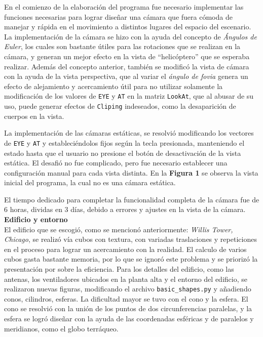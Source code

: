 \documentclass[letterpaper,11pt]{article}
\begin{document}
En el comienzo de la elaboración del programa fue necesario implementar las funciones necesarias para lograr diseñar una cámara que fuera cómoda de manejar y rápida en el movimiento a distintos lugares del espacio del escenario. La implementación de la cámara se hizo con la ayuda del concepto de \textit{Ángulos de Euler}, los cuales son bastante útiles para las rotaciones que se realizan en la cámara, y generan un mejor efecto en la vista de ``helicóptero'' que se esperaba realizar. Además del concepto anterior, también se modificó la vista de cámara con la ayuda de la vista perspectiva, que al variar el \textit{ángulo de fovia} genera un efecto de alejamiento y acercamiento útil para no utilizar solamente la modificación de los valores de \texttt{EYE} y \texttt{AT} en la matriz \texttt{LookAt}, que al abusar de su uso, puede generar efectos de \texttt{Cliping} indeseados, como la desaparición de cuerpos en la vista.

La implementación de las cámaras estáticas, se resolvió modificando los vectores de \texttt{EYE} y \texttt{AT} y estableciéndolos fijos según la tecla presionada, manteniendo el estado hasta que el usuario no presione el botón de desactivación de la vista estática. El desafió no fue complicado, pero fue necesario establecer una configuración manual para cada vista distinta. En la \textbf{Figura 1} se observa la vista inicial del programa, la cual no es una cámara estática.

El tiempo dedicado para completar la funcionalidad completa de la cámara fue de 6 horas, dividas en 3 días, debido a errores y ajustes en la vista de la cámara.\\

{\centering \textbf{{\Large Edificio y entorno}}}\\

El edificio que se escogió, como se mencionó anteriormente: \textit{Willis Tower, Chicago}, se realizó vía cubos con textura, con variadas traslaciones y repeticiones en el proceso para lograr un acercamiento con la realidad. El calculo de varios cubos gasta bastante memoria, por lo que se ignoró este problema y se priorizó la presentación por sobre la eficiencia. Para los detalles del edificio, como las antenas, los ventiladores ubicados en la planta alta y el entorno del edificio, se realizaron nuevas figuras, modificando  el archivo \texttt{basic\_shapes.py} y añadiendo conos, cilindros, esferas. La dificultad mayor se tuvo con el cono y la esfera. El cono se resolvió con la unión de los puntos de dos circunferencias paralelas, y la esfera se logró diseñar con la ayuda de las coordenadas esféricas y de paralelos y meridianos, como el globo terráqueo.
\end{document}
